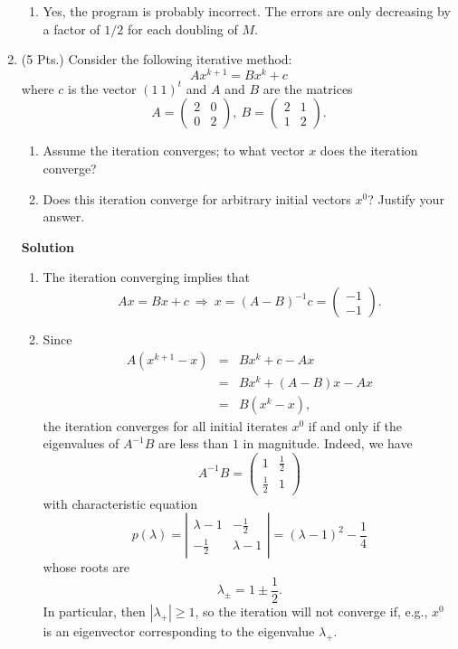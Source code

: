 \documentclass{article}
\begin{document}
\begin{enumerate}
\begin{enumerate}
\item Yes, the program is probably incorrect.  The errors are only decreasing by a factor of \(1/2\) for each doubling of \(M\).

\end{enumerate}



\item (5 Pts.) Consider the following iterative method:
\[A x^{k + 1} = B x^k + c\]
where \(c\) is the vector \((1 \ 1)^t\) and \(A\) and \(B\) are the matrices
\[A = \left( \begin{array}{cc} 2 & 0 \\ 0 & 2 \end{array} \right), \ 
  B = \left( \begin{array}{cc} 2 & 1 \\ 1 & 2 \end{array} \right).\]

\begin{enumerate}
\item Assume the iteration converges; to what vector \(x\) does the iteration converge?

\item Does this iteration converge for arbitrary initial vectors \(x^0\)?  Justify your answer.

\end{enumerate}

{\bf Solution}

\begin{enumerate}
\item The iteration converging implies that
\[Ax = Bx + c \ \Rightarrow \ x = (A - B)^{-1} c = \left( \begin{array}{c} -1 \\ -1 \end{array} \right).\]

\item Since
\begin{eqnarray*}
A(x^{k + 1} - x)
& = & Bx^k + c - Ax \\
& = & Bx^k + (A - B)x - Ax \\
& = & B(x^k - x),
\end{eqnarray*}
the iteration converges for all initial iterates \(x^0\) if and only if the eigenvalues of \(A^{-1} B\) are less than \(1\) in magnitude.  Indeed, we have
\[A^{-1} B = \left( \begin{array}{cc} 1 & \frac{1}{2} \\ \frac{1}{2} & 1 \end{array} \right)\]
with characteristic equation
\[p(\lambda) = \left| \begin{array}{cc} \lambda - 1 & -\frac{1}{2} \\ -\frac{1}{2} & \lambda - 1 \end{array} \right|
             = (\lambda - 1)^2 - \frac{1}{4}\]
whose roots are
\[\lambda_{\pm} = 1 \pm \frac{1}{2}.\]
In particular, then \(|\lambda_+| \geq 1\), so the iteration will not converge if, e.g., \(x^0\) is an eigenvector corresponding to the eigenvalue \(\lambda_+\).


\end{enumerate}
\end{enumerate}
\end{document}
